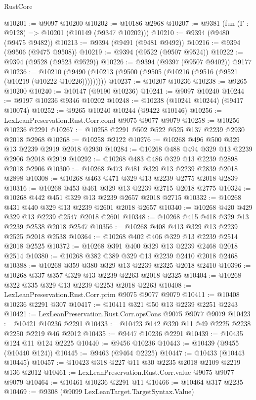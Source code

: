 \begin{lexlean}{RustCore}
\begin{coremodule}
@10201 := @9097 @10200
@10202 := @10186 @2968
@10207 := @9381 (fun (Γ : @9128) => @10201 (@10149 (@9347 @10202)))
@10210 := @9394 (@9480 (@9475 @9482))
@10213 := @9394 (@9491 (@9481 @9492))
@10216 := @9394 (@9506 (@9475 @9508))
@10219 := @9394 (@9522 (@9507 @9524))
@10222 := @9394 (@9528 (@9523 @9529))
@10226 := @9394 (@9397 (@9507 @9402)) @9177
@10236 := @10210 (@9490 (@10213 (@9500 (@9505 (@10216 (@9516 (@9521 (@10219 (@10222 @10226)))))))))
@10237 := @10207 @10236
@10238 := @9265 @10200
@10240 := @10147 (@9190 @10236)
@10241 := @9097 @10240
@10244 := @9197 @10236 @9346 @10202
@10248 := @10238 (@10241 @10244) (@9417 @10074)
@10252 := @9265 @10240 @10244 (@9422 @10146)
@10256 := LexLeanPreservation.Rust.Corr.cond @9075 @9077 @9079
@10258 := @10256 @10236 @2291
@10267 := @10258 @2291 @502 @522 @525 @137 @2239 @2930 @2018 @2968
@10268 := @10258 @2122
@10276 := @10268 @496 @500 @329 @13 @2239 @2919 @2018 @2930
@10284 := @10268 @488 @494 @329 @13 @2239 @2906 @2018 @2919
@10292 := @10268 @483 @486 @329 @13 @2239 @2898 @2018 @2906
@10300 := @10268 @473 @481 @329 @13 @2239 @2839 @2018 @2898
@10308 := @10268 @463 @471 @329 @13 @2239 @2775 @2018 @2839
@10316 := @10268 @453 @461 @329 @13 @2239 @2715 @2018 @2775
@10324 := @10268 @442 @451 @329 @13 @2239 @2657 @2018 @2715
@10332 := @10268 @431 @440 @329 @13 @2239 @2601 @2018 @2657
@10340 := @10268 @420 @429 @329 @13 @2239 @2547 @2018 @2601
@10348 := @10268 @415 @418 @329 @13 @2239 @2538 @2018 @2547
@10356 := @10268 @408 @413 @329 @13 @2239 @2525 @2018 @2538
@10364 := @10268 @402 @406 @329 @13 @2239 @2514 @2018 @2525
@10372 := @10268 @391 @400 @329 @13 @2239 @2468 @2018 @2514
@10380 := @10268 @382 @389 @329 @13 @2239 @2410 @2018 @2468
@10388 := @10268 @359 @380 @329 @13 @2239 @2325 @2018 @2410
@10396 := @10268 @337 @357 @329 @13 @2239 @2263 @2018 @2325
@10404 := @10268 @322 @335 @329 @13 @2239 @2253 @2018 @2263
@10408 := LexLeanPreservation.Rust.Corr.prim @9075 @9077 @9079
@10411 := @10408 @10236 @2291 @307
@10417 := @10411 @321 @50 @13 @2239 @2251 @2243
@10421 := LexLeanPreservation.Rust.Corr.opsCons @9075 @9077 @9079
@10423 := @10421 @10236 @2291
@10433 := @10423 @142 @320 @11 @49 @2225 @2238 @2250 @2219 @46 @2012
@10435 := @9447 @10236 @2291
@10439 := @10435 @124 @11 @124 @2225
@10440 := @9456 @10236
@10443 := @10439 (@9455 (@10440 @124))
@10445 := @9463 (@9464 @2225)
@10447 := @10433 (@10443 @10445)
@10457 := @10423 @318 @227 @11 @30 @2235 @2018 @2109 @2219 @136 @2012
@10461 := LexLeanPreservation.Rust.Corr.value @9075 @9077 @9079
@10464 := @10461 @10236 @2291 @11
@10466 := @10464 @317 @2235
@10469 := @9308 (@9099 LexLeanTarget.TargetSyntax.Value)

\end{coremodule}
\end{lexlean}

